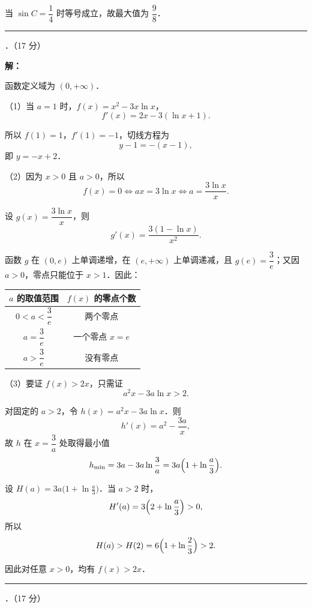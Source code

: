 \documentclass[a4paper,12pt]{ctexart}
\begin{document}
当 $\sin C = \dfrac{1}{4}$ 时等号成立，故最大值为 $\dfrac{9}{8}$．

\vspace{0.2cm}
{\small\noindent\rule{\textwidth}{0.2pt}}

\vspace{0.4cm}
{．（17 分）}

\textbf{解：}

函数定义域为 $(0, +\infty)$．

（1）当 $a = 1$ 时，$f(x) = x^{2} - 3x \ln x$，
\[
f'(x) = 2x - 3(\ln x + 1).
\]

所以 $f(1) = 1$，$f'(1) = -1$，切线方程为
\[
y - 1 = -(x - 1),
\]
即 $y = -x + 2$．

（2）因为 $x > 0$ 且 $a > 0$，所以
\[
f(x) = 0 \iff ax = 3\ln x \iff a = \frac{3\ln x}{x}.
\]

设 $g(x) = \dfrac{3\ln x}{x}$，则
\[
g'(x) = \frac{3(1 - \ln x)}{x^{2}}.
\]

函数 $g$ 在 $(0, e)$ 上单调递增，在 $(e, +\infty)$ 上单调递减，且 $g(e) = \dfrac{3}{e}$；又因 $a > 0$，零点只能位于 $x > 1$．因此：

\begin{center}
\begin{tabular}{cc}
\toprule
$a$ 的取值范围 & $f(x)$ 的零点个数 \\
\midrule
$0 < a < \dfrac{3}{e}$ & 两个零点 \\[3pt]
$a = \dfrac{3}{e}$ & 一个零点 $x = e$ \\[3pt]
$a > \dfrac{3}{e}$ & 没有零点 \\
\bottomrule
\end{tabular}
\end{center}

（3）要证 $f(x) > 2x$，只需证
\[
a^{2}x - 3a\ln x > 2.
\]

对固定的 $a > 2$，令 $h(x) = a^{2}x - 3a\ln x$．则
\[
h'(x) = a^{2} - \frac{3a}{x},
\]
故 $h$ 在 $x = \dfrac{3}{a}$ 处取得最小值
\[
h_{\min} = 3a - 3a\ln\frac{3}{a} = 3a\Bigl(1 + \ln\frac{a}{3}\Bigr).
\]

设 $H(a) = 3a\bigl(1 + \ln\frac{a}{3}\bigr)$．当 $a > 2$ 时，
\[
H'(a) = 3\Bigl(2 + \ln\frac{a}{3}\Bigr) > 0,
\]
所以
\[
H(a) > H(2) = 6\Bigl(1 + \ln\frac{2}{3}\Bigr) > 2.
\]

因此对任意 $x > 0$，均有 $f(x) > 2x$．

\vspace{0.2cm}
{\small\noindent\rule{\textwidth}{0.2pt}}

\vspace{0.4cm}
{．（17 分）}
\end{document}
